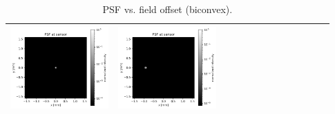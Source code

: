 \documentclass[11pt,a4paper]{article}
\begin{document}
\begin{table}[H]
\begin{tabular}{>{\centering\arraybackslash}m{0.31\linewidth} >{\centering\arraybackslash}m{0.31\linewidth} >{\centering\arraybackslash}m{0.31\linewidth}}
			\includegraphics[width=\linewidth,keepaspectratio]{sweep_N/biconvex_psf_3200_log.png} &
			\includegraphics[width=\linewidth,keepaspectratio]{offaxis/biconvex_psf_35.00_log.png} \\
			\bottomrule
		\end{tabular}
		\caption{PSF vs. field offset (biconvex).}
	\end{table}
	
\end{document}
